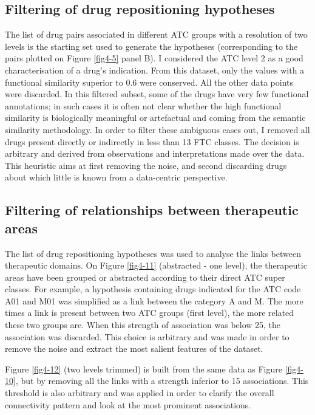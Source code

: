 \subsection{Filtering of drug repositioning hypotheses}
The list of drug pairs associated in different ATC groups with a resolution of two levels is the starting set used to generate the hypotheses (corresponding to the pairs plotted on Figure \ref{fig4-5} panel B). I considered the ATC level 2 as a good characterisation of a drug’s indication. From this dataset, only the values with a functional similarity superior to 0.6 were conserved. All the other data points were discarded. In this filtered subset, some of the drugs have very few functional annotations; in such cases it is often not clear whether the high functional similarity is biologically meaningful or artefactual and coming from the semantic similarity methodology. In order to filter these ambiguous cases out, I removed all drugs present directly or indirectly in less than 13 FTC classes. The decision is arbitrary and derived from observations and interpretations made over the data. This heuristic aims at first removing the noise, and second discarding drugs about which little is known from a data-centric perspective.

\subsection{Filtering of relationships between therapeutic areas}
The list of drug repositioning hypotheses was used to analyse the links between therapeutic domains. On Figure \ref{fig4-11} (abstracted - one level), the therapeutic areas have been grouped or abstracted according to their direct ATC super classes. For example, a hypothesis containing drugs indicated for the ATC code A01 and M01 was simplified as a link between the category A and M. The more times a link is present between two ATC groups (first level), the more related these two groups are. When this strength of association was below 25, the association was discarded. This choice is arbitrary and was made in order to remove the noise and extract the most salient features of the dataset.

Figure \ref{fig4-12} (two levels trimmed) is built from the same data as Figure \ref{fig4-10}, but by removing all the links with a strength inferior to 15 associations. This threshold is also arbitrary and was applied in order to clarify the overall connectivity pattern and look at the most prominent associations.
